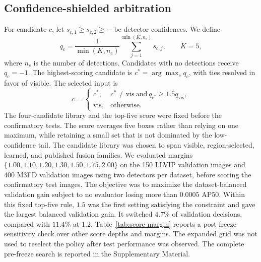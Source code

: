 \documentclass[preprint,11pt]{elsarticle}
\begin{document}
\subsection{Confidence-shielded arbitration}

For candidate \(c\), let
\(s_{c,1}\ge s_{c,2}\ge\cdots\) be detector confidences. We define
\begin{equation}
q_c=\frac{1}{\min(K,n_c)}
\sum_{j=1}^{\min(K,n_c)}s_{c,j},
\qquad K=5,
\end{equation}
where \(n_c\) is the number of detections. Candidates with no detections receive
\(q_c=-1\). The highest-scoring candidate is
\(c^\ast=\arg\max_c q_c\), with ties resolved in favor of visible. The selected
input is
\begin{equation}
c=
\begin{cases}
c^\ast, & c^\ast\ne\mathrm{vis}\ \text{and}\ q_{c^\ast}\ge1.5q_{\mathrm{vis}},\\
\mathrm{vis}, & \text{otherwise}.
\end{cases}
\end{equation}
The four-candidate library and the top-five score were fixed before the
confirmatory tests. The score averages five boxes rather than relying on one
maximum, while retaining a small set that is not dominated by the low-confidence
tail. The candidate library was chosen to span visible, region-selected,
learned, and published fusion families. We evaluated margins
\(\{1.00,1.10,1.20,1.30,1.50,1.75,2.00\}\) on the 150 LLVIP validation images
and 400 M3FD validation images using two detectors per dataset, before scoring
the confirmatory test images. The objective was to maximize the
dataset-balanced validation gain subject to no evaluator losing more than
\(0.0005\) AP50. Within this fixed top-five rule, \(1.5\) was the first setting
satisfying the constraint and gave the largest balanced validation gain. It
switched \(4.7\%\) of validation decisions, compared with \(11.4\%\) at 1.2.
Table~\ref{tab:score-margin} reports a post-freeze sensitivity check over other
score depths and margins. The expanded grid was not used to reselect the policy
after test performance was observed. The complete pre-freeze search is reported
in the Supplementary Material.
\end{document}
